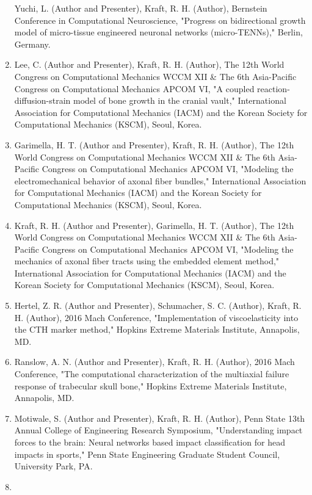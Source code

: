 \documentclass[
]{article}
\begin{document}
\begin{enumerate}
  Yuchi, L. (Author and Presenter), Kraft, R. H. (Author), Bernstein
  Conference in Computational Neuroscience, "Progress on bidirectional
  growth model of micro-tissue engineered neuronal networks
  (micro-TENNs)," Berlin, Germany.
\item
  Lee, C. (Author and Presenter), Kraft, R. H. (Author), The 12th World
  Congress on Computational Mechanics WCCM XII \& The 6th Asia-Pacific
  Congress on Computational Mechanics APCOM VI, "A coupled
  reaction-diffusion-strain model of bone growth in the cranial vault,"
  International Association for Computational Mechanics (IACM) and the
  Korean Society for Computational Mechanics (KSCM), Seoul, Korea.
\item
  Garimella, H. T. (Author and Presenter), Kraft, R. H. (Author), The
  12th World Congress on Computational Mechanics WCCM XII \& The 6th
  Asia-Pacific Congress on Computational Mechanics APCOM VI, "Modeling
  the electromechanical behavior of axonal fiber bundles," International
  Association for Computational Mechanics (IACM) and the Korean Society
  for Computational Mechanics (KSCM), Seoul, Korea.
\item
  Kraft, R. H. (Author and Presenter), Garimella, H. T. (Author), The
  12th World Congress on Computational Mechanics WCCM XII \& The 6th
  Asia-Pacific Congress on Computational Mechanics APCOM VI, "Modeling
  the mechanics of axonal fiber tracts using the embedded element
  method," International Association for Computational Mechanics (IACM)
  and the Korean Society for Computational Mechanics (KSCM), Seoul,
  Korea.
\item
  Hertel, Z. R. (Author and Presenter), Schumacher, S. C. (Author),
  Kraft, R. H. (Author), 2016 Mach Conference, "Implementation of
  viscoelasticity into the CTH marker method," Hopkins Extreme Materials
  Institute, Annapolis, MD.
\item
  Ranslow, A. N. (Author and Presenter), Kraft, R. H. (Author), 2016
  Mach Conference, "The computational characterization of the multiaxial
  failure response of trabecular skull bone," Hopkins Extreme Materials
  Institute, Annapolis, MD.
\item
  Motiwale, S. (Author and Presenter), Kraft, R. H. (Author), Penn State
  13th Annual College of Engineering Research Symposium, "Understanding
  impact forces to the brain: Neural networks based impact
  classification for head impacts in sports," Penn State Engineering
  Graduate Student Council, University Park, PA.
\item

\end{enumerate}
\end{document}
